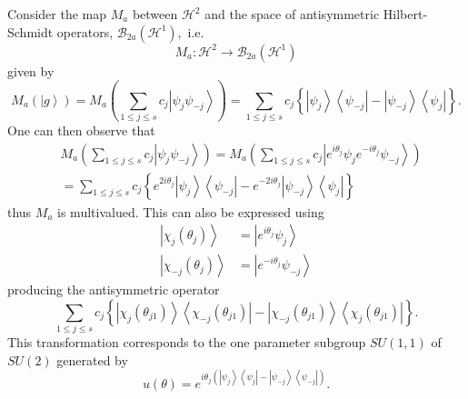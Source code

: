 \documentclass[aps,preprint]{revtex4}%
\begin{document}
Consider the map $M_{a}$ between $\mathcal{H}^{2}$ and the space of
antisymmetric Hilbert-Schmidt operators, $\mathcal{B}_{2a}\left(
\mathcal{H}^{1}\right)  ,$ i.e.
\begin{equation}
M_{a}:\mathcal{H}^{2}\rightarrow\mathcal{B}_{2a}\left(  \mathcal{H}%
^{1}\right)
\end{equation}
given by%
\begin{equation}
M_{a}\left(  \left\vert g\right\rangle \right)  =M_{a}\left(  \sum_{1\leq
j\leq s}c_{j}\left\vert \psi_{j}\psi_{-j}\right\rangle \right)  =\sum_{1\leq
j\leq s}c_{j}\left\{  \left\vert \psi_{j}\right\rangle \left\langle \psi
_{-j}\right\vert -\left\vert \psi_{-j}\right\rangle \left\langle \psi
_{j}\right\vert \right\}  .
\end{equation}
One can then observe that
\begin{align}
&  M_{a}\left(  \sum_{1\leq j\leq s}c_{j}\left\vert \psi_{j}\psi
_{-j}\right\rangle \right)  =M_{a}\left(  \sum_{1\leq j\leq s}c_{j}\left\vert
e^{i\theta_{j}}\psi_{j}e^{-i\theta_{j}}\psi_{-j}\right\rangle \right)
\nonumber\\
&  =\sum_{1\leq j\leq s}c_{j}\left\{  e^{2i\theta_{j}}\left\vert \psi
_{j}\right\rangle \left\langle \psi_{-j}\right\vert -e^{-2i\theta_{j}%
}\left\vert \psi_{-j}\right\rangle \left\langle \psi_{j}\right\vert \right\}
\end{align}
thus $M_{a}$ is multivalued. This can also be expressed using
\begin{align}
\left\vert \chi_{j}\left(  \theta_{j}\right)  \right\rangle  &  =\left\vert
e^{i\theta_{j}}\psi_{j}\right\rangle \nonumber\\
\left\vert \chi_{-j}\left(  \theta_{j}\right)  \right\rangle  &  =\left\vert
e^{-i\theta_{j}}\psi_{-j}\right\rangle
\end{align}
producing the antisymmetric operator
\begin{equation}
\sum_{1\leq j\leq s}c_{j}\left\{  \left\vert \chi_{j}\left(  \theta
_{j1}\right)  \right\rangle \left\langle \chi_{-j}\left(  \theta_{j1}\right)
\right\vert -\left\vert \chi_{-j}\left(  \theta_{j1}\right)  \right\rangle
\left\langle \chi_{j}\left(  \theta_{j1}\right)  \right\vert \right\}  .
\end{equation}
This transformation corresponds to the one parameter subgroup $SU\left(
1,1\right)  $ of $SU(2)$ generated by
\begin{equation}
u\left(  \theta\right)  =e^{i\theta_{j}\left(  \left\vert \psi_{j}%
\right\rangle \left\langle \psi_{j}\right\vert -\left\vert \psi_{-j}%
\right\rangle \left\langle \psi_{-j}\right\vert \right)  }.
\end{equation}
\end{document}
